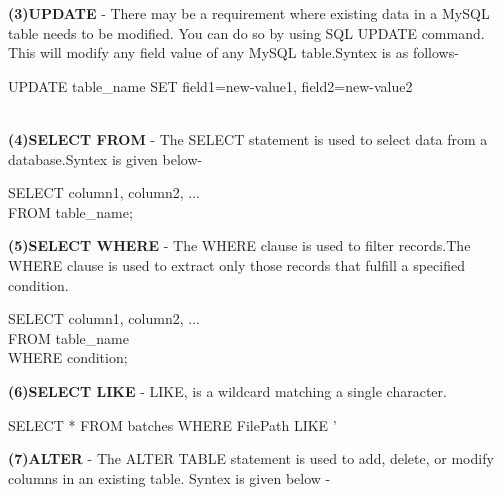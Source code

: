 \documentclass[100pt]{article}
\begin{document}
   \textbf{(3)UPDATE} - There may be a requirement where existing data in a MySQL table needs to be modified. You can do so by using SQL UPDATE command. This will modify any field value of any MySQL table.Syntex is as follows-\\
   
             \begin{center}
             	  UPDATE table_name SET field1=new-value1, field2=new-value2\\
                  [WHERE Clause]\\
             \end{center}
      
   \textbf{(4)SELECT FROM} - The SELECT statement is used to select data from a database.Syntex is given below-\\
   
               \begin{center}
               	SELECT column1, column2, ...\\
           	    FROM table_name;\\
               \end{center}
   	
   \textbf{(5)SELECT WHERE} - The WHERE clause is used to filter records.The WHERE clause is used to extract only those records that fulfill a specified condition.\\
   
               \begin{center}
               	SELECT column1, column2, ...\\
                FROM table_name\\
                WHERE condition;\\
               \end{center}
 
   \textbf{(6)SELECT LIKE} - LIKE, is a wildcard matching a single character.\\
   
             \begin{center}
             	 SELECT * FROM batches 
                 WHERE FilePath LIKE '%
             \end{center}
   
   \textbf{(7)ALTER} - The ALTER TABLE statement is used to add, delete, or modify columns in an existing table. Syntex is given below - \\
   
\end{document}
